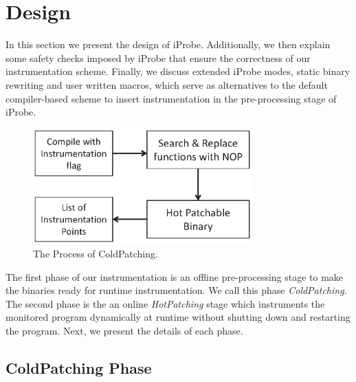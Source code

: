 
\section{Design}
\label{sec:design}

In this section we present the design of iProbe.
Additionally, we then explain some safety checks imposed by iProbe that ensure the correctness of our instrumentation scheme. 
Finally, we discuss extended iProbe modes, static binary rewriting and user written macros, which serve as alternatives to the default compiler-based scheme to insert instrumentation in the pre-processing stage of iProbe.

\begin{figure}[t]
  \begin{center}
    \includegraphics[width=0.75\textwidth]{iprobe/Images/coldpatch.eps}
    \caption{The Process of ColdPatching.}
    \label{fig:coldpatch}
  \end{center}
\end{figure}

The first phase of our instrumentation is an offline pre-processing stage to make the binaries ready for runtime instrumentation. We call this phase \emph{ColdPatching}. 
The second phase is the an online \emph{HotPatching} stage which instruments the monitored program dynamically at runtime without shutting down and restarting the program. 
Next, we present the details of each phase.


\subsection{ColdPatching Phase}
\label{sec:coldpatch}


